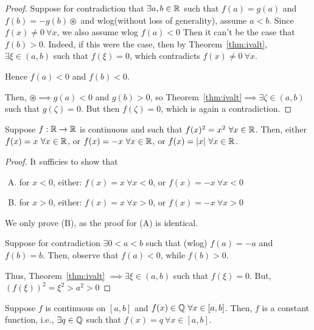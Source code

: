 \begin{proof}
    Suppose for contradiction that $\exists a, b \in \mathbb R$ such that $f(a) = g(a)$ and $f(b) = -g(b) \circledast$
    and wlog(without loss of generality), assume $a < b$.
    Since $f(x) \neq 0\ \forall x$, we also assume wlog $f(a) < 0$
    Then it can't be the case that $f(b) > 0$. 
    Indeed, if this were the case, then by Theorem~\ref{thm:ivalt},
    $\exists \xi \in (a, b)$ such that $f(\xi) = 0$, which contradicts $f(x) \neq 0\ \forall x$.

    Hence $f(a) < 0$ and $f(b) < 0$. 
    
    Then, $\circledast \implies g(a) < 0$ and $g(b) > 0$, 
    so Theorem~\ref{thm:ivalt}$\implies \exists \zeta \in (a, b)$ such that $g(\zeta) = 0$.
    But then $f(\zeta) = 0$, which is again a contradiction.
\end{proof}

\begin{example}
    Suppose $f: \mathbb R \to \mathbb R$ is continuous and such that $f(x)^2 = x^2\ \forall x \in \RR$.
    Then, either $f(x) = x\ \forall x \in \mathbb R$, or $f(x) = -x\ \forall x \in \RR$, or $f(x) = |x|\ \forall x \in \RR$.
\end{example}

\begin{proof}
    It sufficies to show that 
    \begin{enumerate}[(A)]
        \item for $x < 0$, either: $f(x) = x\ \forall x < 0$, or $f(x) = -x\ \forall x < 0$
        \item for $x > 0$, either: $f(x) = x\ \forall x > 0$, or $f(x) = -x\ \forall x > 0$
    \end{enumerate}
    We only prove (B), as the proof for (A) is identical.

    Suppose for contradiction $\exists 0 < a < b$ such that (wlog) $f(a) = -a$ and $f(b) = b$.
    Then, observe that $f(a) < 0$, while $f(b) > 0$.

    Thus, Theorem~\ref{thm:ivalt} $\implies \exists \xi \in (a, b)$ such that $f(\xi) = 0$.
    But, $(f(\xi))^2 = \xi^2 > a^2 > 0$
\end{proof}

\begin{example}
    Suppose $f$ is continuous on $\left[a, b\right]$ and $f(x) \in \mathbb Q\ \forall x \in \left[a, b\right]$.
    Then, $f$ is a constant function, i.e., $\exists q \in \mathbb Q$ such that $f(x) = q\ \forall x \in \left[a, b\right]$.
\end{example}

